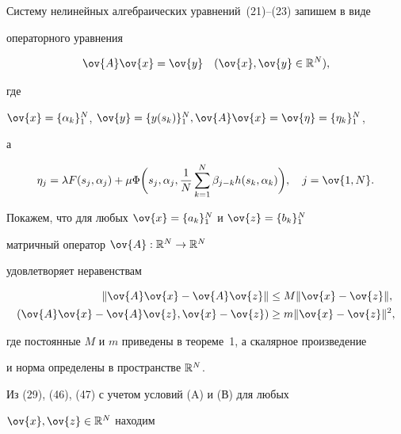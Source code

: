 Систему нелинейных алгебраических уравнений~(21)--(23) запишем в виде


операторного уравнения


\begin{equation}


\ov{A}\ov{x}=\ov{y}\quad (\ov{x},\ov{y}\in \Bbb R^N),


\end{equation}


где


$\ov{x}=\{\alpha_k\}_1^N$, $\ov{y}=\{y(s_k)\}_1^N, \ov{A}\ov{x}=


\ov{\eta}=\{\eta_k\}_1^N$,


а


\begin{equation}


\eta_j=\lambda F(s_j,\alpha_j)+\mu \Phi\bigg(s_j,\alpha_j,


\frac{1}{N}\sum_{k=1}^N\beta_{j-k}h(s_k,\alpha_k)\bigg),


\quad j=\ov{1,N}.


\end{equation}





Покажем, что для любых $\ov{x}=\{a_k\}_1^N$ и $\ov{z}=\{b_k\}_1^N$


матричный оператор $\operator{\ov{A}}{\Bbb R^N}{\Bbb R^N}$


удовлетворяет неравенствам


\begin{align}


\|\ov{A}\ov{x}-\ov{A}\ov{z}\|&\leq M \|\ov{x}-\ov{z}\|, \\


(\ov{A}\ov{x}-\ov{A}\ov{z},\ov{x}-\ov{z})&\geq


m \|\ov{x}-\ov{z}\|^2,


\end{align}


где постоянные $M$ и $m$ приведены в теореме~1, а скалярное произведение


и норма определены в пространстве $\Bbb R^N$.





Из (29), (46), (47) с учетом условий (A) и (В) для любых


$\ov{x},\ov{z}\in \Bbb R^N$ находим


